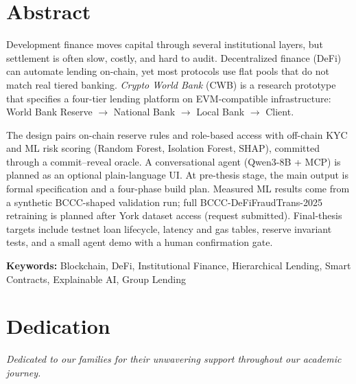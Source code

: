 \documentclass[12pt,a4paper]{report}
\begin{document}
\chapter*{Abstract}
{}

Development finance moves capital through several institutional layers, but settlement is often slow, costly, and hard to audit. Decentralized finance (DeFi) can automate lending on-chain, yet most protocols use flat pools that do not match real tiered banking. \textit{Crypto World Bank} (CWB) is a research prototype that specifies a four-tier lending platform on EVM-compatible infrastructure: World Bank Reserve $\to$ National Bank $\to$ Local Bank $\to$ Client.

The design pairs on-chain reserve rules and role-based access with off-chain KYC and ML risk scoring (Random Forest, Isolation Forest, SHAP), committed through a commit--reveal oracle. A conversational agent (Qwen3-8B + MCP) is planned as an optional plain-language UI. At pre-thesis stage, the main output is formal specification and a four-phase build plan. Measured ML results come from a synthetic BCCC-shaped validation run; full BCCC-DeFiFraudTrans-2025 retraining is planned after York dataset access (request submitted). Final-thesis targets include testnet loan lifecycle, latency and gas tables, reserve invariant tests, and a small agent demo with a human confirmation gate.

\vspace{0.5em}
\noindent\textbf{Keywords:} Blockchain, DeFi, Institutional Finance, Hierarchical Lending, Smart Contracts, Explainable AI, Group Lending

\newpage
\thispagestyle{empty}

\chapter*{Dedication}
{}

\vspace{3cm}
\begin{center}
\textit{Dedicated to our families for their unwavering support throughout our academic journey.}
\end{center}

\newpage
\thispagestyle{empty}
\end{document}
